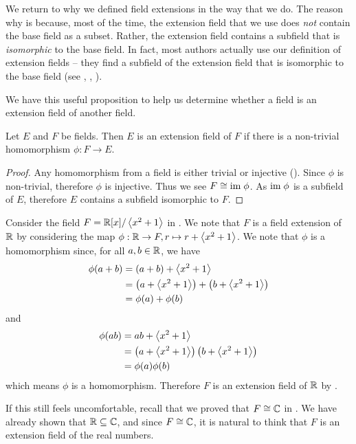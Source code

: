 We return to why we defined field extensions in the way that we do. The reason why is because, most of the time, the extension field that we use does \textit{not} contain the base field as a subset. Rather, the extension field contains a subfield that is \textit{isomorphic} to the base field. In fact, most authors actually use our definition of extension fields -- they find a subfield of the extension field that is isomorphic to the base field (see \cite[Theorem 13.1.3]{dummit_foote_2004}, \cite[p.~339, Proof]{gallian_2016}, \cite[Example 21.2]{judson_beezer_2022}).

We have this useful proposition to help us determine whether a field is an extension field of another field.

\begin{proposition}\label{prop-extension-field-if-homomorphism-between-fields}
    Let $E$ and $F$ be fields. Then $E$ is an extension field of $F$ if there is a non-trivial homomorphism $\phi: F \to E$.
\end{proposition}
\begin{proof}
    Any homomorphism from a field is either trivial or injective (). Since $\phi$ is non-trivial, therefore $\phi$ is injective. Thus we see $F \cong \mathrm{im}\;\phi$. As $\mathrm{im}\;\phi$ is a subfield of $E$, therefore $E$ contains a subfield isomorphic to $F$.
\end{proof}

\begin{example}
    Consider the field $F = \mathbb{R}[x]/\left\langle x^2+1\right\rangle$ in . We note that $F$ is a field extension of $\mathbb{R}$ by considering the map $\phi: \mathbb{R} \to F, r \mapsto r + \left\langle x^2+1\right\rangle$. We note that $\phi$ is a homomorphism since, for all $a, b \in \mathbb{R}$, we have
    \begin{align*}
        \phi(a + b) &= (a + b) + \left\langle x^2+1\right\rangle\\
        &= \left(a + \left\langle x^2+1\right\rangle\right) + \left(b + \left\langle x^2+1\right\rangle\right)\\
        &= \phi(a) + \phi(b)
    \end{align*}
    and
    \begin{align*}
        \phi(ab) &= ab + \left\langle x^2+1\right\rangle\\
        &= \left(a + \left\langle x^2+1\right\rangle\right)\left(b + \left\langle x^2+1\right\rangle\right)\\
        &= \phi(a)\phi(b)
    \end{align*}
    which means $\phi$ is a homomorphism. Therefore $F$ is an extension field of $\mathbb{R}$ by .

    If this still feels uncomfortable, recall that we proved that $F \cong \mathbb{C}$ in . We have already shown that $\mathbb{R} \subseteq \mathbb{C}$, and since $F \cong \mathbb{C}$, it is natural to think that $F$ is an extension field of the real numbers.
\end{example}

